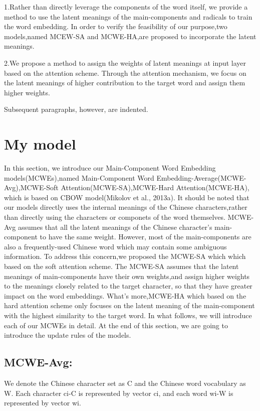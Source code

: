 \documentclass[runningheads]{llncs}
\begin{document}
\begin{CJK}{UTF8}{gkai}
1.Rather than directly leverage the components of the word itself, we provide a method to use the latent meanings of the main-components and radicals to train the word embedding.
In order to verify the feasibility of our purpose,two models,named MCEW-SA and MCWE-HA,are proposed to incorporate the latent meanings.

2.We propose a method to assign the weights of latent meanings at input layer based on the attention scheme.
Through the attention mechanism, we focus on the latent meanings of higher contribution to the target word and assign them higher weights.

Subsequent paragraphs, however, are indented.
\end{CJK} 

\section{My model}
In this section, we introduce our Main-Component Word Embedding models(MCWEs),named Main-Component Word Embedding-Average(MCWE-Avg),MCWE-Soft Attention(MCWE-SA),MCWE-Hard Attention(MCWE-HA),
which is based on CBOW model(Mikolov et al., 2013a).
It should be noted that our models directly uses the internal meanings of the Chinese characters,rather than directly using the characters or componets of the word themselves.
MCWE-Avg assumes that all the latent meanings of the Chinese character's main-component to have the same weight.
However, most of the main-components are also a frequently-used Chinese word which may contain some ambiguous information.
To address this concern,we proposed the MCWE-SA which which based on the soft attention scheme.
The MCWE-SA assumes that the latent meanings of main-components have their own weights,and assign higher weights to the meanings closely related to the target character,
so that they have greater impact on the word embeddings.
What's more,MCWE-HA which based on the hard attention scheme only focuses on the latent meaning of the main-component with the highest similarity to the target word.
In what follows, we will introduce each of our MCWEs in detail.
At the end of this section, we are going to introduce the update rules of the models.
\subsection{MCWE-Avg:} We denote the Chinese character set as C and the Chinese word vocabulary as W. Each character ci-C is represented by vector ci, 
and each word wi-W is represented by vector wi.
\end{document}
